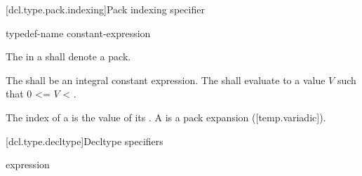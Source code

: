 \documentclass{wg21}
\begin{document}
\begin{addedblock}

[dcl.type.pack.indexing]{Pack indexing specifier}

\begin{bnf}
    \br
    typedef-name  \terminal{[} constant-expression \terminal{]}  \br
\end{bnf}

The  in a  shall denote a pack.

The  shall be an integral constant expression.
The  shall evaluate to a value $V$ such that 0 <= $V$ < .

The index of a  is the value of its .
A  is a pack expansion ([temp.variadic]).


\end{addedblock}



[dcl.type.decltype]{Decltype specifiers}%
%

\begin{bnf}
    \br
     \terminal{(} expression \terminal{)}
\end{bnf}
\end{document}
